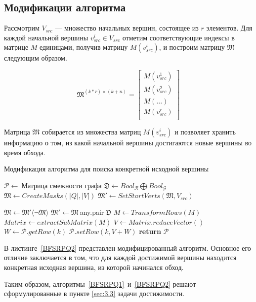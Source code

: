 \pagebreak

\subsection{Модификации алгоритма}

Рассмотрим $V_{src}$ --- множество начальных вершин, состоящее из $r$ элементов. Для каждой начальной вершины $v_{src}^i \in V_{src}$ отметим соответствующие индексы в матрице $M$ единицами, получив матрицу $M(v_{src}^i)$,  и построим матрицу $\mathfrak{M}$ следующим образом.

\begin{equation}
\mathfrak{M}^{(k*r) \times (k + n)} =
  \left[
    \begin{matrix}
        M(v_{src}^1) \\
        M(v_{src}^2) \\ 
        M(\dots) \\
        M(v_{src}^r) \\
    \end{matrix}
  \right]
\end{equation}

Матрица $\mathfrak{M}$ собирается из множества матриц $M(v_{src}^i)$ и позволяет хранить информацию о том, из какой начальной вершины достигаются новые вершины во время обхода. 

\begin{algorithm}[t]
  \caption{Модификация алгоритма для поиска конкретной исходной вершины}\label{BFSRPQ2}
  \begin{algorithmic}[1]
    \State $\mathcal{P}\gets~${Матрица смежности графа}
    \State $\mathfrak{D}\gets Bool_\mathcal{R} \bigoplus Bool_\mathcal{G}$
    \State $\mathfrak{M}\gets CreateMasks(|Q|,|V|)$
    \State $\mathfrak{M}'\gets SetStartVerts(\mathfrak{M}, V_{src})$  
    
      \State $\mathfrak{M}\gets \mathfrak{M}'\langle\neg\mathfrak{M}\rangle$
        \State $\mathfrak{M}'\gets \mathfrak{M}~$any.pair$~\mathfrak{D}$
            \State $M\gets TransformRows(M)$
        \EndFor
      \EndFor
        \State $Matrix\gets extractSubMatrix(M)$
        \State $V\gets Matrix.reduceVector()$
        \State $W\gets\mathcal{P}.getRow(k)$
        \State $\mathcal{P}.setRow(k, V+W)$
      \EndFor
    \EndWhile
    \State \textbf{return} $\mathcal{P}$
    \EndProcedure
  \end{algorithmic}
\end{algorithm}

В листинге~\ref{BFSRPQ2} представлен модифицированный алгоритм. Основное его отличие заключается в том, что для каждой достижимой вершины находится конкретная исходная вершина, из которой начинался обход.

Таким образом, алгоритмы~\ref{BFSRPQ1}~и~\ref{BFSRPQ2} решают сформулированные в пункте \ref{sec:3.3} задачи достижимости.
